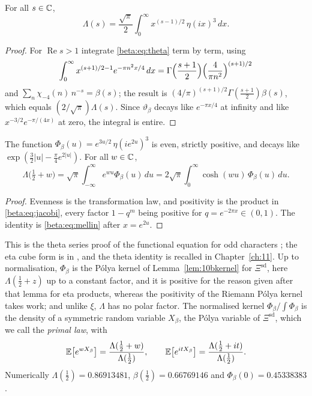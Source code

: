 \begin{proposition}\label{beta:prop:mellin}
For all $s\in\mathbb{C}$,
\begin{equation}\label{beta:eq:mellin}
\Lambda(s)=\frac{\sqrt\pi}{2}\int_0^\infty x^{(s-1)/2}\,\eta(ix)^3\,dx .
\end{equation}
\end{proposition}

\begin{proof}
For $\operatorname{Re} s>1$ integrate \eqref{beta:eq:theta} term by term, using
\[
\int_0^\infty x^{(s+1)/2-1}e^{-\pi n^2x/4}\,dx=\Gamma\Bigl(\frac{s+1}{2}\Bigr)\Bigl(\frac{4}{\pi n^2}\Bigr)^{(s+1)/2}
\]
and $\sum_n\chi_{-4}(n)\,n^{-s}=\beta(s)$; the result is $(4/\pi)^{(s+1)/2}\Gamma(\tfrac{s+1}{2})\beta(s)$, which equals $(2/\sqrt\pi)\Lambda(s)$. Since $\vartheta_\beta$ decays like $e^{-\pi x/4}$ at infinity and like $x^{-3/2}e^{-\pi/(4x)}$ at zero, the integral is entire.
\end{proof}

\begin{proposition}\label{beta:prop:kernel}
The function $\Phi_\beta(u)=e^{3u/2}\,\eta(ie^{2u})^3$ is even, strictly positive, and decays like $\exp(\tfrac32|u|-\tfrac\pi4e^{2|u|})$. For all $w\in\mathbb{C}$,
\begin{equation}\label{beta:eq:kernel}
\Lambda\bigl(\tfrac12+w\bigr)=\sqrt\pi\int_{-\infty}^{\infty}e^{wu}\Phi_\beta(u)\,du
=2\sqrt\pi\int_0^\infty\cosh(wu)\,\Phi_\beta(u)\,du .
\end{equation}
\end{proposition}

\begin{proof}
Evenness is the transformation law, and positivity is the product in \eqref{beta:eq:jacobi}, every factor $1-q^m$ being positive for $q=e^{-2\pi x}\in(0,1)$. The identity is \eqref{beta:eq:mellin} after $x=e^{2u}$.
\end{proof}

This is the theta series proof of the functional equation for odd characters \cite{iwanieckowalski2004}; the eta cube form is in \cite[Section~8.1]{polson2018vdp}, and the theta identity is recalled in Chapter~\ref{ch:11}. Up to normalisation, $\Phi_\beta$ is the P\'olya kernel of Lemma~\ref{lem:10bkernel} for $\Xi^{\mathrm{sd}}$, here $\Lambda(\tfrac12+z)$ up to a constant factor, and it is positive for the reason given after that lemma for eta products, whereas the positivity of the Riemann P\'olya kernel takes work; and unlike $\xi$, $\Lambda$ has no polar factor. The normalised kernel $\Phi_\beta/\int\Phi_\beta$ is the density of a symmetric random variable $X_\beta$, the P\'olya variable of $\Xi^{\mathrm{sd}}$, which we call the \emph{primal law}, with
\begin{equation}\label{beta:eq:primal}
\mathbb{E}\bigl[e^{wX_\beta}\bigr]=\frac{\Lambda(\tfrac12+w)}{\Lambda(\tfrac12)},\qquad
\mathbb{E}\bigl[e^{itX_\beta}\bigr]=\frac{\Lambda(\tfrac12+it)}{\Lambda(\tfrac12)} .
\end{equation}
Numerically $\Lambda(\tfrac12)=0.86913481$, $\beta(\tfrac12)=0.66769146$ and $\Phi_\beta(0)=0.45338383$.

